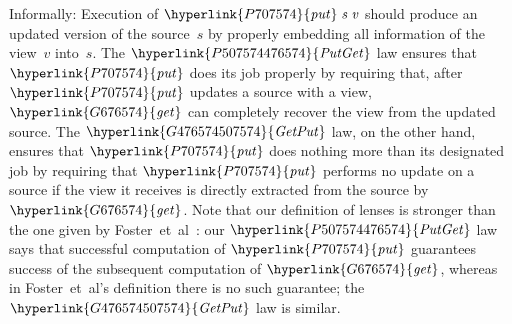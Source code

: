 \documentclass[fleqn]{llncs}
\newcommand{\identifier}[1]{\mathit{#1}}
\begin{document}
Informally:
Execution of \ensuremath{\protect\hyperlink{P707574}{\identifier{put}}\;\identifier{s}\;\identifier{v}} should produce an updated version of the source~\ensuremath{\identifier{s}} by properly embedding all information of the view~\ensuremath{\identifier{v}} into~\ensuremath{\identifier{s}}.
The \ensuremath{\protect\hyperlink{P507574476574}{\identifier{PutGet}}} law ensures that \ensuremath{\protect\hyperlink{P707574}{\identifier{put}}} does its job properly by requiring that, after \ensuremath{\protect\hyperlink{P707574}{\identifier{put}}} updates a source with a view, \ensuremath{\protect\hyperlink{G676574}{\identifier{get}}} can completely recover the view from the updated source.
The \ensuremath{\protect\hyperlink{G476574507574}{\identifier{GetPut}}} law, on the other hand, ensures that \ensuremath{\protect\hyperlink{P707574}{\identifier{put}}} does nothing more than its designated job by requiring that \ensuremath{\protect\hyperlink{P707574}{\identifier{put}}} performs no update on a source if the view it receives is directly extracted from the source by \ensuremath{\protect\hyperlink{G676574}{\identifier{get}}}.
Note that our definition of lenses is stronger than the one given by Foster~et~al~\cite{Foster-lenses}: our \ensuremath{\protect\hyperlink{P507574476574}{\identifier{PutGet}}} law says that successful computation of \ensuremath{\protect\hyperlink{P707574}{\identifier{put}}} guarantees success of the subsequent computation of \ensuremath{\protect\hyperlink{G676574}{\identifier{get}}}, whereas in Foster~et~al's definition there is no such guarantee; the \ensuremath{\protect\hyperlink{G476574507574}{\identifier{GetPut}}} law is similar.
\end{document}
